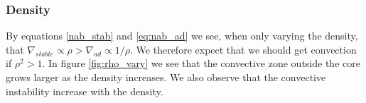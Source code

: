 \documentclass[a4paper,10pt]{article}
\begin{document}
\subsubsection{Density}
By equations \eqref{nab_stab} and \eqref{eq:nab_ad} we see, when only varying the density, that $\nabla_{stable} \propto \rho > \nabla_{ad} \propto 1/\rho$. We therefore expect that we should get convection if $\rho^2 > 1$. In figure \ref{fig:rho_vary} we see that the convective zone outside the core grows larger as the density increases. We also observe that the convective instability increase with the density.


\begin{figure}[H]
\centering
{}
 \\

\end{figure}
\end{document}
